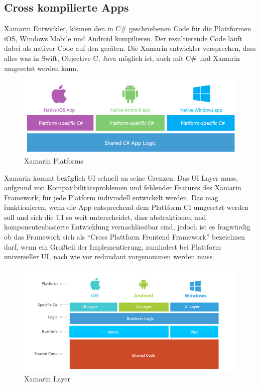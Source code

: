\subsection{Cross kompilierte Apps}

Xamarin Entwickler, können den in C\# geschriebenen Code für die Plattformen iOS, Windows Mobile und Android kompilieren.
Der resultierende Code läuft dabei als nativer Code auf den geräten.
Die Xamarin entwickler versprechen, dass alles was in Swift, Objective-C, Java möglich ist, auch mit C\# und Xamarin umgesetzt werden kann.\cite{projectxamarin}

\begin{figure}[ht]
 \centering
 \includegraphics[width=0.9\linewidth]{kapitel2/csharp_xamarin.png}
 \caption{Xamarin Platforms \cite{7Reas20:online}}
\end{figure}
\vspace{1cm}

Xamarin kommt bezüglich \ac{UI} schnell an seine Grenzen. Das \ac{UI} Layer muss, aufgrund von Kompatibilitätsproblemen und fehlender Features des Xamarin Framework,
für jede Platform indiviudell entwickelt werden. Das mag funktionieren, wenn die App entsprechend dem Plattform CI umgesetzt werden soll und sich die \ac{UI} so weit unterscheidet,
dass abstraktionen und komponentenbasierte Entwicklung vernachlässibar sind, jedoch ist es fragwürdig ob das Framework sich als ``Cross Plattform Frontend Framework'' bezeichnen darf,
wenn ein Großteil der Implementierung, zumindest bei Plattform universeller \ac{UI}, nach wie vor redundant vorgenommen werden muss.\cite{7Reas20:online}

\begin{figure}[ht]
 \centering
 \includegraphics[width=0.8\linewidth]{kapitel2/xamarin_ui_blocker.png}
 \caption{Xamarin Layer \cite{7Reas20:online}}
\end{figure}

